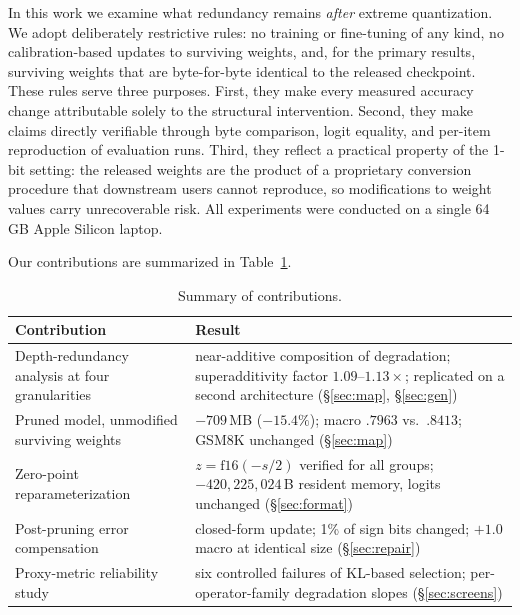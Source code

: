 \documentclass[10pt]{article}
\begin{document}
In this work we examine what redundancy remains \emph{after} extreme quantization. We adopt deliberately restrictive rules: no training or fine-tuning of any kind, no calibration-based updates to surviving weights, and, for the primary results, surviving weights that are byte-for-byte identical to the released checkpoint. These rules serve three purposes. First, they make every measured accuracy change attributable solely to the structural intervention. Second, they make claims directly verifiable through byte comparison, logit equality, and per-item reproduction of evaluation runs. Third, they reflect a practical property of the 1-bit setting: the released weights are the product of a proprietary conversion procedure that downstream users cannot reproduce, so modifications to weight values carry unrecoverable risk. All experiments were conducted on a single 64\,GB Apple Silicon laptop.

Our contributions are summarized in Table~\ref{tab:contrib}.

\begin{table}[h]
\centering\small
\begin{tabular}{p{}p{}}
\toprule
Contribution & Result \\
\midrule
Depth-redundancy analysis at four granularities & near-additive composition of degradation; superadditivity factor $1.09$--$1.13\times$; replicated on a second architecture (\S\ref{sec:map}, \S\ref{sec:gen}) \\
Pruned model, unmodified surviving weights & $-709$\,MB ($-15.4\%$); macro $.7963$ vs.\ $.8413$; GSM8K unchanged (\S\ref{sec:map}) \\
Zero-point reparameterization & $z=\mathrm{f16}(-s/2)$ verified for all groups; $-420{,}225{,}024$\,B resident memory, logits unchanged (\S\ref{sec:format}) \\
Post-pruning error compensation & closed-form update; 1\% of sign bits changed; $+1.0$ macro at identical size (\S\ref{sec:repair}) \\
Proxy-metric reliability study & six controlled failures of KL-based selection; per-operator-family degradation slopes (\S\ref{sec:screens}) \\
\bottomrule
\end{tabular}
\caption{Summary of contributions.}
\label{tab:contrib}
\end{table}
\end{document}
